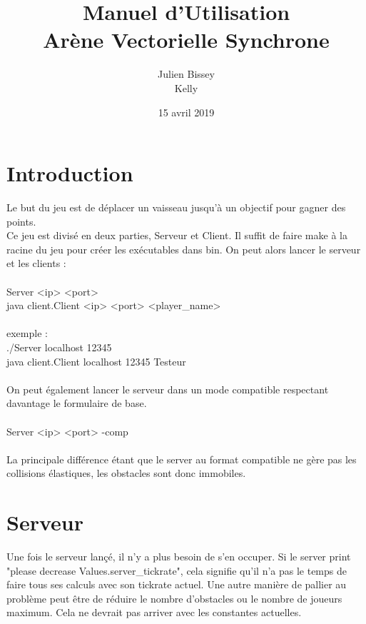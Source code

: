 \documentclass{article}
\begin{document}
\title{Manuel d'Utilisation\\
Arène Vectorielle Synchrone{}}
\author{Julien Bissey\\Kelly}
\date{15 avril 2019}

\maketitle

\section{Introduction}
Le but du jeu est de déplacer un vaisseau jusqu'à un objectif pour gagner des points.\\
Ce jeu est divisé en deux parties, Serveur et Client.
Il suffit de faire make à la racine du jeu pour créer les exécutables dans bin.
On peut alors lancer le serveur et les clients :\\
\\
Server <ip> <port>\\
java client.Client <ip> <port> <player\_name>\\
\\
exemple :\\
./Server localhost 12345\\
java client.Client localhost 12345 Testeur\\
\\
On peut également lancer le serveur dans un mode compatible respectant davantage le formulaire de base.\\
\\
Server <ip> <port> -comp\\
\\
La principale différence étant que le server au format compatible ne gère pas les collisions élastiques, les obstacles sont donc immobiles.

\section{Serveur}

Une fois le serveur lançé, il n'y a plus besoin de s'en occuper.
Si le server print "please decrease Values.server\_tickrate", cela signifie qu'il n'a pas le temps
de faire tous ses calculs avec son tickrate actuel. Une autre manière de pallier au problème peut être de réduire le nombre d'obstacles ou le nombre de joueurs maximum.
Cela ne devrait pas arriver avec les constantes actuelles.\\
\end{document}
